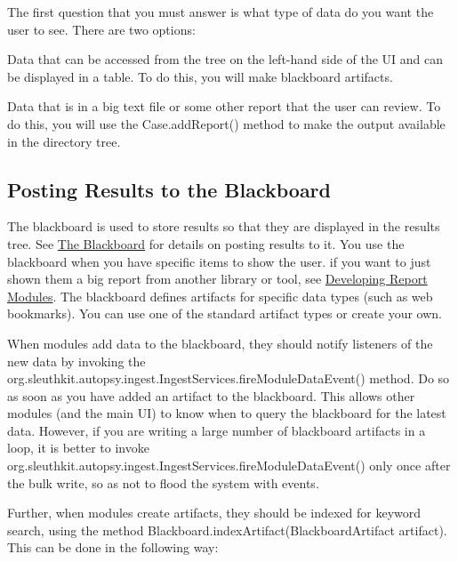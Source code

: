 The first question that you must answer is what type of data do you want the user to see. There are two options\+:


\begin{DoxyEnumerate}
\item Data that can be accessed from the tree on the left-\/hand side of the UI and can be displayed in a table. To do this, you will make blackboard artifacts.
\item Data that is in a big text file or some other report that the user can review. To do this, you will use the Case.\+add\+Report() method to make the output available in the directory tree.
\end{DoxyEnumerate}\hypertarget{mod_ingest_page_ingest_modules_making_results_bb}{}\subsection{Posting Results to the Blackboard}\label{mod_ingest_page_ingest_modules_making_results_bb}
The blackboard is used to store results so that they are displayed in the results tree. See \hyperlink{platform_page_platform_blackboard}{The Blackboard} for details on posting results to it. You use the blackboard when you have specific items to show the user. if you want to just shown them a big report from another library or tool, see \hyperlink{mod_report_page}{Developing Report Modules}. The blackboard defines artifacts for specific data types (such as web bookmarks). You can use one of the standard artifact types or create your own.

When modules add data to the blackboard, they should notify listeners of the new data by invoking the org.\+sleuthkit.\+autopsy.\+ingest.\+Ingest\+Services.\+fire\+Module\+Data\+Event() method. Do so as soon as you have added an artifact to the blackboard. This allows other modules (and the main UI) to know when to query the blackboard for the latest data. However, if you are writing a large number of blackboard artifacts in a loop, it is better to invoke org.\+sleuthkit.\+autopsy.\+ingest.\+Ingest\+Services.\+fire\+Module\+Data\+Event() only once after the bulk write, so as not to flood the system with events.

Further, when modules create artifacts, they should be indexed for keyword search, using the method Blackboard.\+index\+Artifact(\+Blackboard\+Artifact artifact). This can be done in the following way\+:


